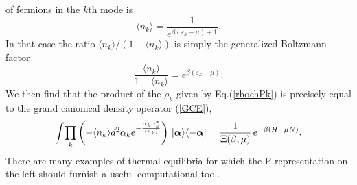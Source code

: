 \documentclass[12pt]{article}
\def\beq{\begin{equation}}
\def\eeq{\end{equation}}
\def\a{\alpha}
\def\ba{{\mbox{\boldmath$\alpha$}}}
\def\sa{\alpha^*}
\def\b{\beta}
\def\e{\varepsilon}
\def\dop{density operator }
\begin{document}
of fermions in the $ k $th mode is 
\beq
\langle n_k \rangle = \frac{ 1 }{ e^ { \beta ( \e_k - \mu ) + 1 } } .
\label {Fermidist}
\eeq
In that case the ratio $ \langle n_k \rangle / ( 1 - \langle n_k \rangle ) $
is simply the generalized Boltzmann factor
\beq
\frac{  \langle n_k \rangle }{ 1 - \langle n_k \rangle }
= e^ { \beta ( \e_k - \mu ) } .
\label {BF}
\eeq
We then find that the product of the $ \rho_k $ given by Eq.(\ref {rhochPk})
is precisely equal to the grand canonical \dop (\ref {GCE}),
\beq
\int \! \prod_k \left( - \langle n_k \rangle d^2 \a_k 
e^ { - \frac{ \a_k \sa_k }{ \langle n_k \rangle } } \right) \,
| \ba \rangle \langle - \ba | = 
\frac { 1 }{ \Xi( \b , \mu ) }
\, e^ { - \beta ( H - \mu N ) } .
\label {climax}
\eeq
There are many examples of thermal equilibria
for which the P-representation on the left
should furnish a useful computational tool. 
\end{document}
